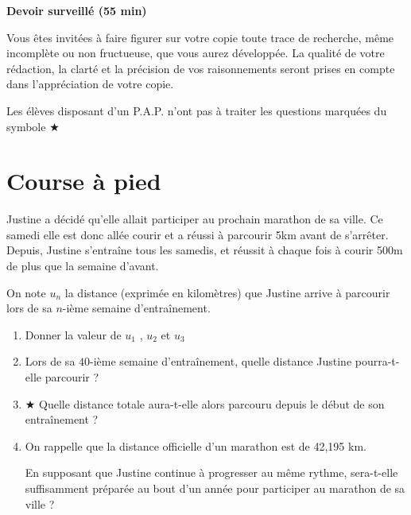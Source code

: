 \documentclass[oneside,12pt]{exam}          %
\begin{document}
\footer{}{\footnotesize \etablissement}{}

\hrulefill\raisebox{-1.9pt}{\quad\decofourleft~\decosix~\decofourright \quad}\hrulefill

\begin{center}
	\textbf{\large Devoir surveillé  (55 min)}
\end{center}
\vspace{-5pt}
Vous êtes invité\textperiodcentered e\textperiodcentered s à faire figurer sur votre copie toute trace de recherche, même incomplète ou non fructueuse, que vous aurez développée. La qualité de votre rédaction, la clarté et la précision de vos raisonnements seront prises en compte dans l’appréciation de votre copie.

Les élèves disposant d'un P.A.P. n'ont pas à traiter les questions marquées du symbole $\bigstar$

\vspace{-8pt}\hrulefill\raisebox{-1.9pt}{\quad\decofourleft~\decosix~\decofourright \quad}\hrulefill
\vspace{5pt}





\section{Course à pied}
Justine a décidé qu'elle allait participer au prochain marathon de sa ville. Ce samedi elle est donc allée courir et a réussi à parcourir 5km avant de s'arrêter. Depuis, Justine s'entraîne tous les samedis, et réussit à chaque fois à courir 500m de plus que la semaine d'avant.

On note $u_n$ la distance (exprimée en kilomètres) que Justine arrive à parcourir lors de sa $n$-ième semaine d'entraînement.
\begin{enumerate}
	\item Donner la valeur de $u_1$ , $u_2$ et $u_3$
	\item Lors de sa $40$-ième semaine d'entraînement, quelle distance Justine pourra-t-elle parcourir ?
	\item $\bigstar$ Quelle distance totale aura-t-elle alors parcouru depuis le début de son entraînement ?
	\item On rappelle que la distance officielle d'un marathon est de 42,195 km. 
	
	En supposant que Justine continue à progresser au même rythme, sera-t-elle suffisamment préparée au bout d'un année pour participer au marathon de sa ville ?
\end{enumerate}
\end{document}
